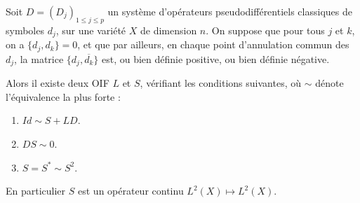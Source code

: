 \begin{prop}
  Soit $D=(D_j)_{1\leq j\leq p}$ un système d'opérateurs pseudodifférentiels classiques de symboles $d_j$, sur une variété $X$ de dimension $n$. On suppose que pour tous $j$ et $k$, on a $\{d_j,d_k\}=0$, et que par ailleurs, en chaque point d'annulation commun des $d_j$, la matrice $\{d_j, \overline{d_k}\}$ est, ou bien définie positive, ou bien définie négative.
  
  \noindent Alors il existe deux OIF $L$ et $S$, vérifiant les
  conditions suivantes, où $\sim$ dénote l'équivalence la plus forte :
  
  \begin{enumerate}
    \item $Id \sim S + LD$.
    \item $DS \sim 0$.
    \item $S=S^* \sim S^2$.
  \end{enumerate}
  
  \noindent En particulier $S$ est un opérateur continu $L^2(X) \mapsto L^2(X)$.
\end{prop}
